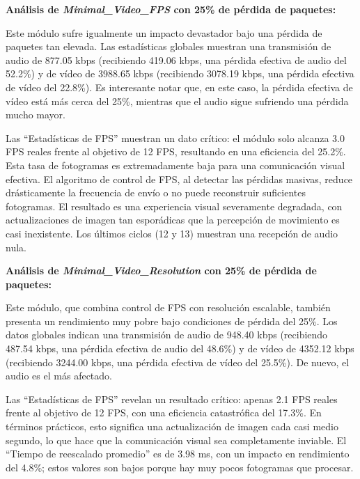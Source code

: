 \vspace{\baselineskip}

\textbf{Análisis de \textit{Minimal\_Video\_FPS} con 25\% de pérdida de paquetes:}
\vspace{\baselineskip}

Este módulo sufre igualmente un impacto devastador bajo una pérdida de paquetes tan elevada. Las estadísticas globales muestran una transmisión de audio de 877.05 kbps (recibiendo 419.06 kbps, una pérdida efectiva de audio del 52.2\%) y de vídeo de 3988.65 kbps (recibiendo 3078.19 kbps, una pérdida efectiva de vídeo del 22.8\%). Es interesante notar que, en este caso, la pérdida efectiva de vídeo está más cerca del 25\%, mientras que el audio sigue sufriendo una pérdida mucho mayor.
\vspace{\baselineskip}

Las ``Estadísticas de FPS'' muestran un dato crítico: el módulo solo alcanza 3.0 FPS reales frente al objetivo de 12 FPS, resultando en una eficiencia del 25.2\%. Esta tasa de fotogramas es extremadamente baja para una comunicación visual efectiva. El algoritmo de control de FPS, al detectar las pérdidas masivas, reduce drásticamente la frecuencia de envío o no puede reconstruir suficientes fotogramas. El resultado es una experiencia visual severamente degradada, con actualizaciones de imagen tan esporádicas que la percepción de movimiento es casi inexistente. Los últimos ciclos (12 y 13) muestran una recepción de audio nula.

\vspace{\baselineskip}

\textbf{Análisis de \textit{Minimal\_Video\_Resolution} con 25\% de pérdida de paquetes:}
\vspace{\baselineskip}

Este módulo, que combina control de FPS con resolución escalable, también presenta un rendimiento muy pobre bajo condiciones de pérdida del 25\%. Los datos globales indican una transmisión de audio de 948.40 kbps (recibiendo 487.54 kbps, una pérdida efectiva de audio del 48.6\%) y de vídeo de 4352.12 kbps (recibiendo 3244.00 kbps, una pérdida efectiva de vídeo del 25.5\%). De nuevo, el audio es el más afectado.
\vspace{\baselineskip}

Las ``Estadísticas de FPS'' revelan un resultado crítico: apenas 2.1 FPS reales frente al objetivo de 12 FPS, con una eficiencia catastrófica del 17.3\%. En términos prácticos, esto significa una actualización de imagen cada casi medio segundo, lo que hace que la comunicación visual sea completamente inviable. El ``Tiempo de reescalado promedio'' es de 3.98 ms, con un impacto en rendimiento del 4.8\%; estos valores son bajos porque hay muy pocos fotogramas que procesar.
\vspace{\baselineskip}

